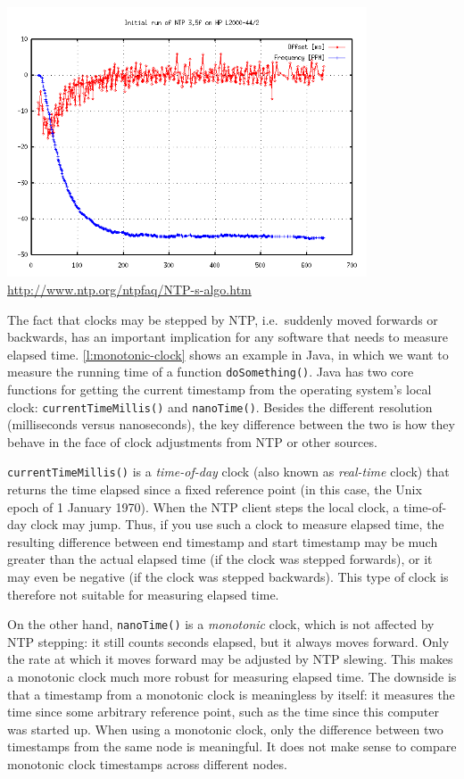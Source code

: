 \begin{frame}
    \label{s:ntp-graph}
    \begin{center}
        \includegraphics[height=8cm]{images/ntp-graph.png}
        \scriptsize\url{http://www.ntp.org/ntpfaq/NTP-s-algo.htm}
    \end{center}
\end{frame}
\label{l:ntp-graph}

The fact that clocks may be stepped by NTP, i.e.\ suddenly moved forwards or backwards, has an important implication for any software that needs to measure elapsed time.
\autoref{l:monotonic-clock} shows an example in Java, in which we want to measure the running time of a function \verb|doSomething()|.
Java has two core functions for getting the current timestamp from the operating system's local clock: \verb|currentTimeMillis()| and \verb|nanoTime()|.
Besides the different resolution (milliseconds versus nanoseconds), the key difference between the two is how they behave in the face of clock adjustments from NTP or other sources.

\verb|currentTimeMillis()| is a \emph{time-of-day} clock (also known as \emph{real-time} clock) that returns the time elapsed since a fixed reference point (in this case, the Unix epoch of 1 January 1970).
When the NTP client steps the local clock, a time-of-day clock may jump.
Thus, if you use such a clock to measure elapsed time, the resulting difference between end timestamp and start timestamp may be much greater than the actual elapsed time (if the clock was stepped forwards), or it may even be negative (if the clock was stepped backwards).
This type of clock is therefore not suitable for measuring elapsed time.

On the other hand, \verb|nanoTime()| is a \emph{monotonic} clock, which is not affected by NTP stepping: it still counts seconds elapsed, but it always moves forward.
Only the rate at which it moves forward may be adjusted by NTP slewing.
This makes a monotonic clock much more robust for measuring elapsed time.
The downside is that a timestamp from a monotonic clock is meaningless by itself: it measures the time since some arbitrary reference point, such as the time since this computer was started up.
When using a monotonic clock, only the difference between two timestamps from the same node is meaningful.
It does not make sense to compare monotonic clock timestamps across different nodes.

